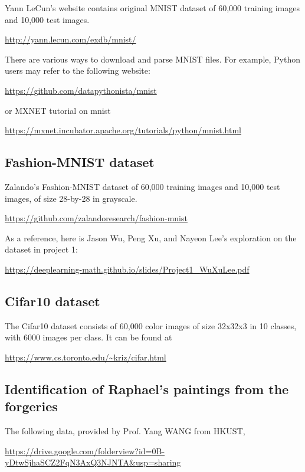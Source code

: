 \documentclass[11pt]{article}
\begin{document}
Yann LeCun's website contains original MNIST dataset of 60,000 training images and 10,000 test images. 

\url{http://yann.lecun.com/exdb/mnist/}

There are various ways to download and parse MNIST files. For example, Python users may refer to the following website:

\url{https://github.com/datapythonista/mnist}

or MXNET tutorial on mnist

\url{https://mxnet.incubator.apache.org/tutorials/python/mnist.html}

\subsection{Fashion-MNIST dataset}

Zalando's Fashion-MNIST dataset of 60,000 training images and 10,000 test images, of size 28-by-28 in grayscale. 

\url{https://github.com/zalandoresearch/fashion-mnist}

As a reference, here is Jason Wu, Peng Xu, and Nayeon Lee's exploration on the dataset in project 1:

\url{https://deeplearning-math.github.io/slides/Project1_WuXuLee.pdf}

\subsection{Cifar10 dataset} 

The Cifar10 dataset consists of 60,000 color images of size 32x32x3 in 10 classes, with 6000 images per class. It can be found at 

\url{https://www.cs.toronto.edu/~kriz/cifar.html}



\subsection{Identification of Raphael's paintings from the forgeries}

The following data, provided by Prof. Yang WANG from HKUST,

\url{https://drive.google.com/folderview?id=0B-yDtwSjhaSCZ2FqN3AxQ3NJNTA&usp=sharing}
\end{document}
